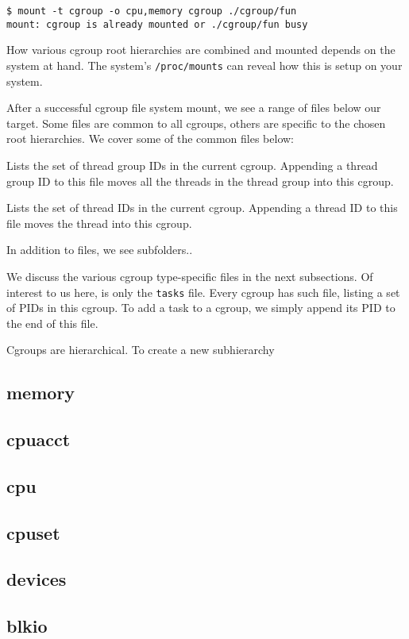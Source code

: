 \begin{lstlisting}
$ mount -t cgroup -o cpu,memory cgroup ./cgroup/fun
mount: cgroup is already mounted or ./cgroup/fun busy
\end{lstlisting}

How various cgroup root hierarchies are combined and mounted depends on the
system at hand. The system's \texttt{/proc/mounts} can reveal how this is setup
on your system.

After a successful cgroup file system mount, we see a range of files below our
target. Some files are common to all cgroups, others are specific to the chosen
root hierarchies. We cover some of the common files below:

\begin{description}[\setleftmargin{0.2in}\breaklabel\setlabelstyle{\tt}]

\item [cgroup.procs] Lists the set of thread group IDs in the current cgroup.
Appending a thread group ID to this file moves all the threads in the thread
group into this cgroup.

\item [tasks] Lists the set of thread IDs in the current cgroup. Appending a
thread ID to this file moves the thread into this cgroup.

\end{description}

In addition to files, we see subfolders..

We discuss the various cgroup type-specific files in the next subsections. Of
interest to us here, is only the \texttt{tasks} file. Every cgroup has such
file, listing a set of PIDs in this cgroup.  To add a task to a cgroup, we
simply append its PID to the end of this file.

Cgroups are hierarchical. To create a new subhierarchy 

\subsection{memory}

\subsection{cpuacct}

\subsection{cpu}

\subsection{cpuset}

\subsection{devices}

\subsection{blkio}
